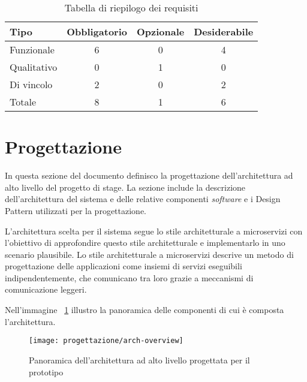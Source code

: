 \begin{table}[H]
\caption{Tabella di riepilogo dei requisiti}
\label{tab:requisiti-riepilogo}
\begin{tabularx}{\linewidth}{|X|c|c|c|}
\hline
\textbf{Tipo} & \textbf{Obbligatorio} & \textbf{Opzionale} & \textbf{Desiderabile} \\
\hline
Funzionale & 6 & 0 & 4 \\
\hline
Qualitativo & 0 & 1 & 0 \\
\hline
Di vincolo & 2 & 0 & 2 \\
\hline
Totale & 8 & 1 & 6 \\
\hline
\end{tabularx}
\end{table}

\pagebreak

\section{Progettazione}


In questa sezione del documento definisco la progettazione dell'architettura ad alto livello del progetto di stage.
La sezione include la descrizione dell'architettura del sistema e delle relative componenti \emph{software} e i Design Pattern utilizzati per la progettazione.


L'architettura scelta per il sistema segue lo stile architetturale a microservizi con l'obiettivo di approfondire questo stile architetturale e implementarlo in uno scenario plausibile.
Lo stile architetturale a microservizi descrive un metodo di progettazione delle applicazioni come insiemi di servizi eseguibili indipendentemente, che comunicano tra loro grazie a meccanismi di comunicazione leggeri.

Nell'immagine ~\ref{img:overview-arch} illustro la panoramica delle componenti di cui è composta l'architettura.

\begin{figure}[H]
    \centering
    \texttt{[image: progettazione/arch-overview]}
    \caption{Panoramica dell'architettura ad alto livello progettata per il prototipo}
    \label{img:overview-arch}
\end{figure}


